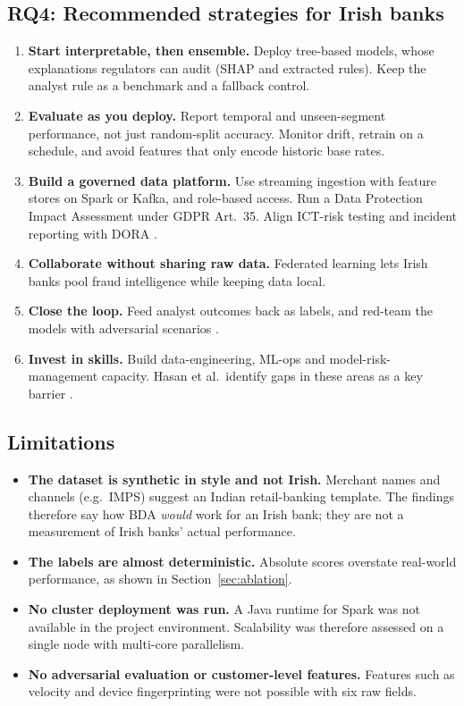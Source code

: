 \documentclass[12pt,a4paper]{article}
\begin{document}
\subsection{RQ4: Recommended strategies for Irish banks}
\begin{enumerate}[nosep]
\item \textbf{Start interpretable, then ensemble.} Deploy tree-based models, whose explanations regulators can audit (SHAP and extracted rules). Keep the analyst rule as a benchmark and a fallback control.
\item \textbf{Evaluate as you deploy.} Report temporal and unseen-segment performance, not just random-split accuracy. Monitor drift, retrain on a schedule, and avoid features that only encode historic base rates.
\item \textbf{Build a governed data platform.} Use streaming ingestion with feature stores on Spark or Kafka, and role-based access. Run a Data Protection Impact Assessment under GDPR Art.~35. Align ICT-risk testing and incident reporting with DORA \citep{dora2022}.
\item \textbf{Collaborate without sharing raw data.} Federated learning \citep{laddi2025federated} lets Irish banks pool fraud intelligence while keeping data local.
\item \textbf{Close the loop.} Feed analyst outcomes back as labels, and red-team the models with adversarial scenarios \citep{padmanaban2026actp}.
\item \textbf{Invest in skills.} Build data-engineering, ML-ops and model-risk-management capacity. Hasan et al.\ identify gaps in these areas as a key barrier \citep{hasan2023bigdata}.
\end{enumerate}

\subsection{Limitations}\label{sec:limits}
\begin{itemize}[nosep]
\item \textbf{The dataset is synthetic in style and not Irish.} Merchant names and channels (e.g.\ IMPS) suggest an Indian retail-banking template. The findings therefore say how BDA \emph{would} work for an Irish bank; they are not a measurement of Irish banks' actual performance.
\item \textbf{The labels are almost deterministic.} Absolute scores overstate real-world performance, as shown in Section~\ref{sec:ablation}.
\item \textbf{No cluster deployment was run.} A Java runtime for Spark was not available in the project environment. Scalability was therefore assessed on a single node with multi-core parallelism.
\item \textbf{No adversarial evaluation or customer-level features.} Features such as velocity and device fingerprinting were not possible with six raw fields.
\end{itemize}
\end{document}
